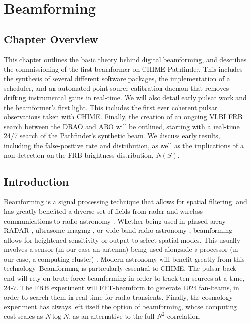 \chapter{Beamforming}
\label{chapter:beamforming}



\section{Chapter Overview}

This chapter outlines the basic theory behind 
digital beamforming, and describes the commissioning 
of the first beamformer on CHIME Pathfinder. This 
includes the synthesis of several different software packages, 
the implementation of a scheduler, 
and an automated point-source calibration daemon that 
removes drifting instrumental gains in real-time. We will 
also detail early pulsar work and the beamformer's first light. 
This includes the first ever coherent pulsar observations 
taken with CHIME. 
Finally, the creation of an ongoing VLBI FRB search between 
the DRAO and ARO will be outlined, starting with a real-time 
24/7 search of the Pathfinder's synthetic beam. We discuss early 
results, including the false-positive rate and distribution, as 
well as the implications of a non-detection on the FRB brightness 
distribution, $N(S)$.

\section{Introduction}

Beamforming is a signal processing technique that allows for 
spatial filtering, and has greatly benefited a diverse set of fields 
from radar and wireless communications to radio astronomy 
\citep{1988IASSP...5....4V}. Whether being used in phased-array RADAR
\citep{2007BAMS...88.1753Z}, 
ultrasonic imaging \citep{macovski1983medical}, or 
wide-band radio astronomy \citep{2013PASA...30....7T}, beamforming 
allows for heightened sensitivity or output to select spatial
modes. This usually involves a sensor (in our case an antenna)
being used alongside a processor (in our case, a computing cluster) 
\citep{1988IASSP...5....4V}. Modern astronomy will benefit greatly from this
technology. 
Beamforming is particularly essential to CHIME. 
The pulsar back-end will rely on
brute-force beamforming in order to track ten sources at a time, 24-7.  
The FRB experiment will FFT-beamform to generate 1024 fan-beams, 
in order to search them in real time for radio transients. Finally, the cosmology 
experiment has always left itself the option of beamforming, whose 
computing cost scales as $N\log N$, as 
an alternative to the full-$N^2$ correlation.
  
